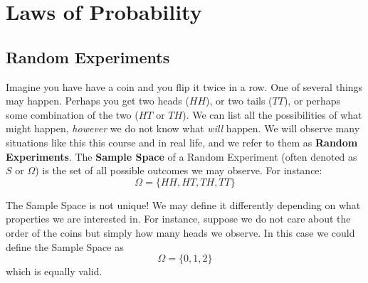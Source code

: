 \section{Laws of Probability}
\subsection{Random Experiments}
Imagine you have have a coin and you flip it twice in a row. One of several things may happen. Perhaps you get two heads ($HH$), or two tails ($TT$), or perhaps some combination of the two ($HT$ or $TH$). We can list all the possibilities of what might happen, \emph{however} we do not know what \emph{will} happen. We will observe many situations like this this course and in real life, and we refer to them as \textbf{Random Experiments}. The \textbf{Sample Space} of a Random Experiment (often denoted as $S$ or $\Omega$) is the set of all possible outcomes we may observe. For instance:
\[
    \Omega=\{HH,HT,TH,TT\}
\]
\begin{notsofast}
The Sample Space is not unique! We may define it differently depending on what properties we are interested in. For instance, suppose we do not care about the order of the coins but simply how many heads we observe. In this case we could define the Sample Space as
\[
    \Omega=\{0,1,2\}
\]
which is equally valid.
\end{notsofast}
